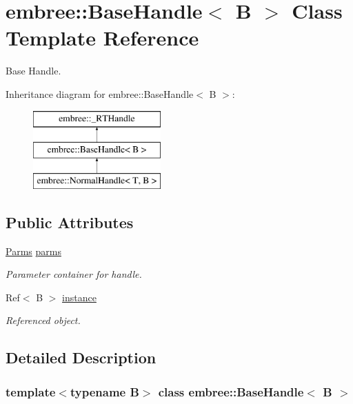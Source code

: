 \hypertarget{classembree_1_1_base_handle}{
\section{embree::BaseHandle$<$ B $>$ Class Template Reference}
\label{classembree_1_1_base_handle}
}


Base Handle.  


Inheritance diagram for embree::BaseHandle$<$ B $>$:\begin{figure}[H]
\begin{center}
\leavevmode
\includegraphics[height=3.000000cm]{classembree_1_1_base_handle}
\end{center}
\end{figure}
\subsection*{Public Attributes}
\begin{DoxyCompactItemize}
\item 
\hyperlink{classembree_1_1_parms}{Parms} \hyperlink{classembree_1_1_base_handle_aeb742be4931066ee2ebc7bb86c2fc760}{parms}
\begin{DoxyCompactList}\small\item\em Parameter container for handle. \item\end{DoxyCompactList}\item 
Ref$<$ B $>$ \hyperlink{classembree_1_1_base_handle_ac138e9f8f11552b6a1c71383ceab5d4f}{instance}
\begin{DoxyCompactList}\small\item\em Referenced object. \item\end{DoxyCompactList}\end{DoxyCompactItemize}


\subsection{Detailed Description}
\subsubsection*{template$<$typename B$>$ class embree::BaseHandle$<$ B $>$}


